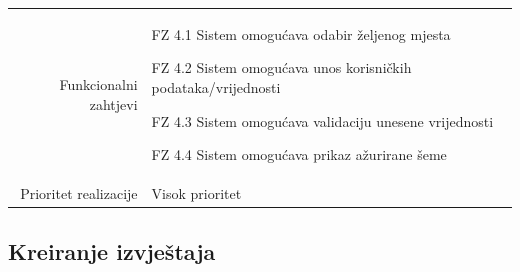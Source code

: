 \documentclass[]{report}
\begin{document}
\begin{tabular}{rp{}}
\\
Funkcionalni zahtjevi &

\begin{compactitem} 
    \item FZ 4.1 Sistem omogućava odabir željenog mjesta
    \item FZ 4.2 Sistem omogućava unos korisničkih podataka/vrijednosti
    \item FZ 4.3 Sistem omogućava validaciju unesene vrijednosti
    \item FZ 4.4 Sistem omogućava prikaz ažurirane šeme
\end{compactitem}

\\
Prioritet realizacije &
\hspace{12pt} 
Visok prioritet
\end{tabular}


\newpage %
\subsection{Kreiranje izvještaja}
\end{document}
